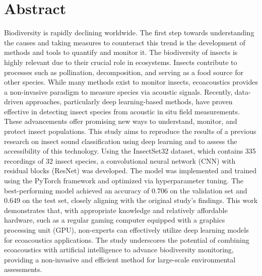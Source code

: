 

\vspace*{\fill}

\section*{Abstract}
\label{abstract}

Biodiversity is rapidly declining worldwide. The first step towards understanding the causes and 
taking measures to counteract this trend is the development of methods and tools to quantify and monitor it. 
The biodiversity of insects is highly relevant due to their crucial role in ecosystems.
Insects contribute to processes such as pollination, decomposition, and serving as a food source for other species.
While many methods exist to monitor insects, ecoacoustics provides a non-invasive paradigm to measure species via acoustic signals.
Recently, data-driven approaches, particularly deep learning-based methods, have proven effective in detecting insect species from acoustic in situ field measurements.
These advancements offer promising new ways to understand, monitor, and protect insect populations.
This study aims to reproduce the results of a previous research on insect sound 
classification using deep learning and to assess the accessibility of this technology. 
Using the InsectSet32 dataset, which contains 335 recordings of 32 insect species, a 
convolutional neural network (CNN) with residual blocks (ResNet) was developed. 
The model was implemented and trained using the 
PyTorch framework and optimized via hyperparameter tuning. The best-performing model 
achieved an accuracy of 0.706 on the validation set and 0.649 on the test set, 
closely aligning with the original study's findings. This work demonstrates that, 
with appropriate knowledge and relatively affordable hardware, such as a regular 
gaming computer equipped with a graphics processing unit (GPU), non-experts can effectively utilize deep 
learning models for ecoacoustics applications. The study underscores the potential 
of combining ecoacoustics with artificial intelligence to advance biodiversity monitoring, 
providing a non-invasive and efficient method for large-scale environmental assessments.

\vspace*{\fill}